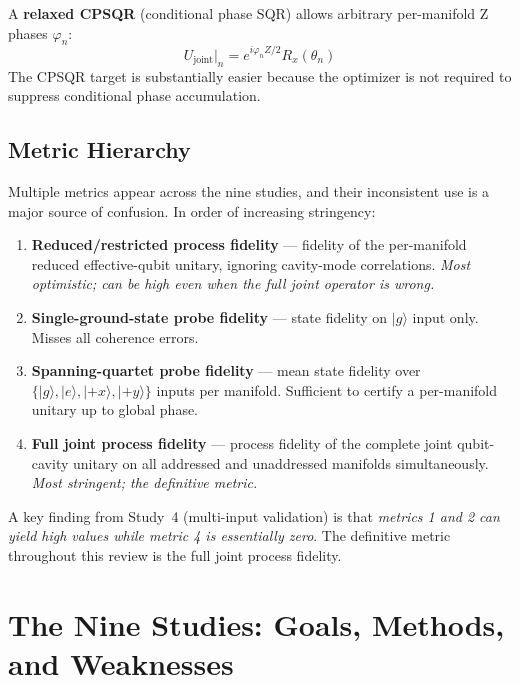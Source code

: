 \documentclass[11pt,letterpaper]{article}
\begin{document}
A \textbf{relaxed CPSQR} (conditional phase SQR) allows arbitrary per-manifold
Z phases $\varphi_n$:
\begin{equation}
  U_\text{joint}\big\vert_{n} = e^{i\varphi_n Z/2} R_x(\theta_n)
\end{equation}
The CPSQR target is substantially easier because the optimizer is not required to
suppress conditional phase accumulation.

\subsection{Metric Hierarchy}

Multiple metrics appear across the nine studies, and their inconsistent use is
a major source of confusion.  In order of increasing stringency:

\begin{enumerate}
\item \textbf{Reduced/restricted process fidelity} --- fidelity of the per-manifold
  reduced effective-qubit unitary, ignoring cavity-mode correlations.
  \emph{Most optimistic; can be high even when the full joint operator is wrong.}
\item \textbf{Single-ground-state probe fidelity} --- state fidelity on
  $\vert g\rangle$ input only.  Misses all coherence errors.
\item \textbf{Spanning-quartet probe fidelity} --- mean state fidelity over
  $\{\vert g\rangle, \vert e\rangle, \vert{+x}\rangle, \vert{+y}\rangle\}$ inputs
  per manifold.  Sufficient to certify a per-manifold unitary up to global phase.
\item \textbf{Full joint process fidelity} --- process fidelity of the complete
  joint qubit-cavity unitary on all addressed and unaddressed manifolds simultaneously.
  \emph{Most stringent; the definitive metric.}
\end{enumerate}

\noindent A key finding from Study~4 (multi-input validation) is that
\emph{metrics 1 and 2 can yield high values while metric 4 is essentially zero}.
The definitive metric throughout this review is the full joint process fidelity.

\section{The Nine Studies: Goals, Methods, and Weaknesses}
\end{document}
